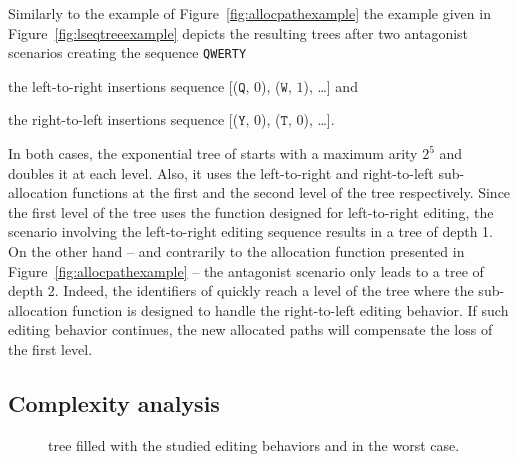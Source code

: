 

Similarly to the example of Figure~\ref{fig:allocpathexample} the example given
in Figure~\ref{fig:lseqtreeexample} depicts the resulting trees after two
antagonist scenarios creating the sequence \texttt{QWERTY}
\begin{inparaenum}[(i)]
\item the left-to-right insertions sequence [($\texttt{Q},\,0$), ($\texttt{W},\,1$),
  \ldots] and
\item the right-to-left insertions sequence [($\texttt{Y},\,0$),
  ($\texttt{T},\,0$), \ldots].
\end{inparaenum}
In both cases, the exponential tree of \LSEQ starts with a maximum arity $2^5$
and doubles it at each level. Also, it uses the left-to-right and right-to-left
sub-allocation functions at the first and the second level of the tree
respectively. Since the first level of the tree uses the function designed for
left-to-right editing, the scenario involving the left-to-right editing sequence
results in a tree of depth 1. On the other hand -- and contrarily to the
allocation function presented in Figure~\ref{fig:allocpathexample} -- the
antagonist scenario only leads to a tree of depth 2. Indeed, the identifiers of
\LSEQ quickly reach a level of the tree where the sub-allocation function is
designed to handle the right-to-left editing behavior. If such editing behavior
continues, the new allocated paths will compensate the loss of the first level.


\subsection{Complexity analysis}
\label{subsec:complexity}

\begin{figure}
  \centering
  \hspace{5pt}
  \hspace{5pt}
  \caption{\label{fig:complexity} \LSEQ tree filled with the studied editing
    behaviors and in the worst case.}
\end{figure}



